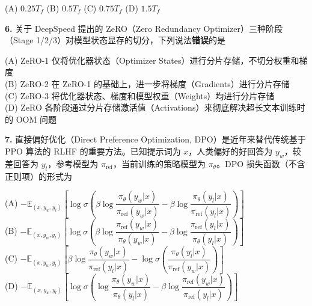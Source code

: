 \documentclass[a4paper]{ctexart}
\begin{document}
\noindent\hspace{1em}(A) $0.25 T_f$ \quad (B) $0.5 T_f$ \quad (C) $0.75 T_f$ \quad (D) $1.5 T_f$

\vspace{0.5em}

\noindent\textbf{6.} 关于 DeepSpeed 提出的 ZeRO（Zero Redundancy Optimizer）三种阶段（Stage 1/2/3）对模型状态显存的切分，下列说法\textbf{错误}的是

\noindent\hspace{1em}(A) ZeRO-1 仅将优化器状态（Optimizer States）进行分片存储，不切分权重和梯度 \\
\noindent\hspace{1em}(B) ZeRO-2 在 ZeRO-1 的基础上，进一步将梯度（Gradients）进行分片存储 \\
\noindent\hspace{1em}(C) ZeRO-3 将优化器状态、梯度和模型权重（Weights）均进行分片存储 \\
\noindent\hspace{1em}(D) ZeRO 各阶段通过分片存储激活值（Activations）来彻底解决超长文本训练时的 OOM 问题

\vspace{0.5em}

\noindent\textbf{7.} 直接偏好优化（Direct Preference Optimization, DPO）是近年来替代传统基于 PPO 算法的 RLHF 的重要方法。已知提示词为 $x$，人类偏好的好回答为 $y_w$，较差回答为 $y_l$，参考模型为 $\pi_{\mathrm{ref}}$，当前训练的策略模型为 $\pi_{\theta}$。DPO 损失函数（不含正则项）的形式为

\noindent\hspace{1em}(A) $-\mathbb{E}_{(x,y_w,y_l)}\!\left[\log\sigma\!\left(\beta\log\dfrac{\pi_\theta(y_w|x)}{\pi_{\mathrm{ref}}(y_w|x)}-\beta\log\dfrac{\pi_\theta(y_l|x)}{\pi_{\mathrm{ref}}(y_l|x)}\right)\right]$ \\[0.8em]
\noindent\hspace{1em}(B) $-\mathbb{E}_{(x,y_w,y_l)}\!\left[\log\sigma\!\left(\beta\log\dfrac{\pi_{\mathrm{ref}}(y_w|x)}{\pi_\theta(y_w|x)}-\beta\log\dfrac{\pi_{\mathrm{ref}}(y_l|x)}{\pi_\theta(y_l|x)}\right)\right]$ \\[0.8em]
\noindent\hspace{1em}(C) $-\mathbb{E}_{(x,y_w,y_l)}\!\left[\beta\log\dfrac{\pi_\theta(y_w|x)}{\pi_{\mathrm{ref}}(y_l|x)}-\log\sigma\!\left(\dfrac{\pi_\theta(y_l|x)}{\pi_{\mathrm{ref}}(y_w|x)}\right)\right]$ \\[0.8em]
\noindent\hspace{1em}(D) $-\mathbb{E}_{(x,y_w,y_l)}\!\left[\log\sigma\!\left(\log\dfrac{\pi_\theta(y_w|x)}{\pi_\theta(y_l|x)}-\beta\log\dfrac{\pi_{\mathrm{ref}}(y_w|x)}{\pi_{\mathrm{ref}}(y_l|x)}\right)\right]$
\end{document}
